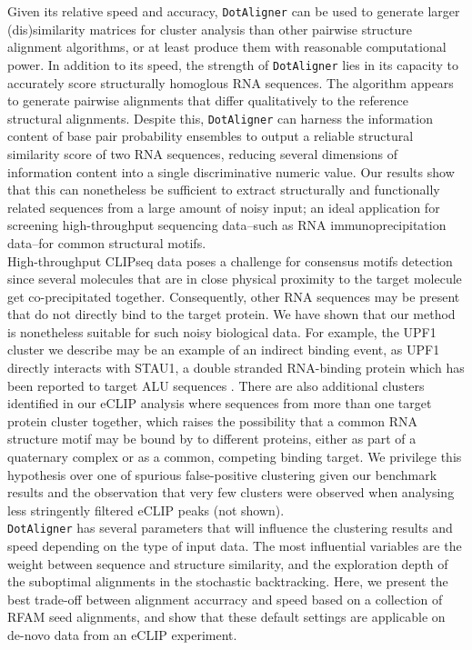 \documentclass{bmcart}
\newcommand\dotaligner{\texttt{DotAligner}}
\begin{document}
Given its relative speed and accuracy, \dotaligner{} can be used to generate
larger (dis)similarity matrices for cluster analysis than other pairwise
structure alignment algorithms, or at least produce them with reasonable
computational power. In addition to its speed, the strength of \dotaligner{} lies in
its capacity to accurately score structurally homoglous RNA sequences. The
algorithm appears to generate pairwise alignments that differ qualitatively to the
reference structural alignments. Despite this, \dotaligner{} can harness the
information content of base pair probability ensembles to output a reliable
structural similarity score of two RNA sequences, reducing several dimensions 
of information content into a single discriminative numeric value.
 Our results show that this
can nonetheless be sufficient to extract structurally and functionally related
sequences from a large amount of noisy input; an ideal application for
screening high-throughput sequencing data--such as RNA immunoprecipitation
data--for common structural motifs. \\

High-throughput CLIPseq data poses a challenge for consensus motifs detection since
several molecules that are in close physical proximity to the target molecule get 
co-precipitated together. Consequently, other RNA sequences may be present 
that do not directly bind to the target protein. We have shown that our 
 method is nonetheless suitable for such noisy biological data. For example, 
 the UPF1 cluster we describe may be an example of an indirect binding event, 
 as UPF1 directly interacts with STAU1, a double stranded RNA-binding protein which has 
been reported to target ALU sequences \cite{gong2011lncrnas}. There are
also additional clusters identified in our eCLIP analysis where sequences from 
more than one target protein cluster together, which raises the possibility 
that a common RNA structure motif may be bound by to different proteins, either
as part of a quaternary complex or as a common, competing binding target. 
We privilege this hypothesis over one of spurious false-positive clustering 
given our benchmark results and the observation that very few clusters
were observed when analysing less stringently filtered eCLIP peaks (not shown). \\

\dotaligner{} has several parameters that will influence the clustering results and 
speed depending on the type of input data. The most influential variables are the weight between sequence and structure similarity, and the exploration depth of the suboptimal alignments in the stochastic
backtracking. Here, we present the best trade-off between alignment
accurracy and speed based on a collection of RFAM seed alignments, and show that these default settings are applicable on de-novo data from an eCLIP experiment. \\
\end{document}
